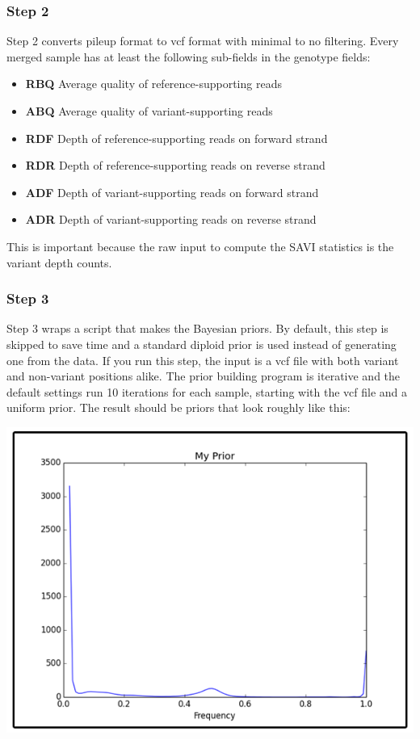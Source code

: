 \documentclass[letterpaper,14pt]{memoir}
\begin{document}
\subsubsection{Step 2}

Step 2 converts pileup format to vcf format with minimal to no filtering.
Every merged sample has at least the following sub-fields in the genotype fields:

\begin{itemize}
\tightlist
\item
  \textbf{RBQ} Average quality of reference-supporting reads
\item
  \textbf{ABQ} Average quality of variant-supporting reads
\item
  \textbf{RDF} Depth of reference-supporting reads on forward strand
\item
  \textbf{RDR} Depth of reference-supporting reads on reverse strand
\item
  \textbf{ADF} Depth of variant-supporting reads on forward strand
\item
  \textbf{ADR} Depth of variant-supporting reads on reverse strand
\end{itemize}

\noindent This is important because the raw input to compute the SAVI statistics is the variant depth counts.

\subsubsection{Step 3}

Step 3 wraps a script that makes the Bayesian priors.
By default, this step is skipped to save time and a standard diploid prior is used instead of generating one from the data.
If you run this step, the input is a vcf file with both variant and non-variant positions alike.
The prior building program is iterative and the default settings run 10 iterations for each sample, starting with the vcf file and a uniform prior. 
The result should be priors that look roughly like this: 

\begin{center}
\includegraphics[scale=0.75]{myprior_600.png}
\end{center}
\end{document}
